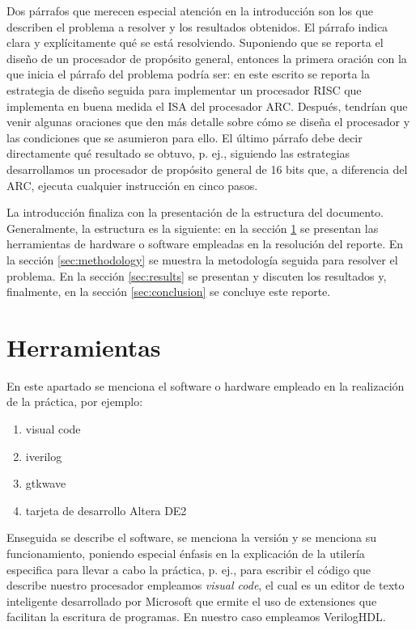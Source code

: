 \documentclass[11pt, twocolumn]{article}
\begin{document}
Dos párrafos que merecen especial atención en la introducción son los que describen el problema a resolver y los resultados obtenidos. El párrafo indica clara y explícitamente qué se está resolviendo. Suponiendo que se reporta el diseño de un procesador de propósito general, entonces la primera oración con la que inicia el párrafo del problema podría ser: en este escrito se reporta la estrategia de diseño seguida para implementar un procesador RISC que implementa en buena medida el ISA del procesador ARC. Después, tendrían que venir algunas oraciones que den más detalle sobre cómo se diseña el procesador y las condiciones que se asumieron para ello. El último párrafo debe decir directamente qué resultado se obtuvo, p. ej., siguiendo las estrategias desarrollamos un procesador de propósito general de 16 bits que, a diferencia del ARC, ejecuta cualquier instrucción en cinco pasos.

La introducción finaliza con la presentación de la estructura del documento. Generalmente, la estructura es la siguiente: en la sección \ref{sec:tools} se presentan las herramientas de hardware o software empleadas en la resolución del reporte. En la sección \ref{sec:methodology} se muestra la metodología seguida para resolver el problema. En la sección \ref{sec:results} se presentan y discuten los resultados y, finalmente, en la sección \ref{sec:conclusion} se concluye este reporte.


\section{Herramientas}\label{sec:tools}

En este apartado se menciona el software o hardware empleado en la realización de la práctica, por ejemplo:
\begin{enumerate}
    \item visual code
    \item iverilog
    \item gtkwave
    \item tarjeta de desarrollo Altera DE2
\end{enumerate}

Enseguida se describe el software, se menciona la versión y se menciona su funcionamiento, poniendo especial énfasis en la explicación de la utilería especifica para llevar a cabo la práctica, p. ej., para escribir el código que describe nuestro procesador empleamos \textit{visual code}, el cual es un editor de texto inteligente desarrollado por Microsoft que ermite el uso de extensiones que facilitan la escritura de programas. En nuestro caso empleamos VerilogHDL.
\end{document}
